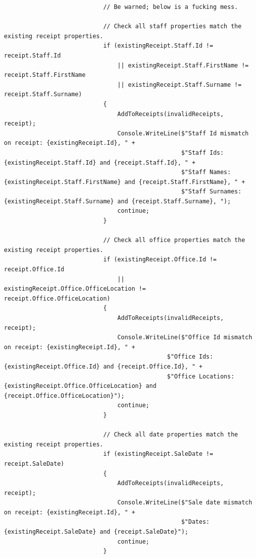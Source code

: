 \documentclass{article}
\begin{document}
\begin{lstlisting}
                            // Be warned; below is a fucking mess.

                            // Check all staff properties match the existing receipt properties.
                            if (existingReceipt.Staff.Id != receipt.Staff.Id
                                || existingReceipt.Staff.FirstName != receipt.Staff.FirstName
                                || existingReceipt.Staff.Surname != receipt.Staff.Surname)
                            {
                                AddToReceipts(invalidReceipts, receipt);
                                Console.WriteLine($"Staff Id mismatch on receipt: {existingReceipt.Id}, " +
                                                  $"Staff Ids: {existingReceipt.Staff.Id} and {receipt.Staff.Id}, " +
                                                  $"Staff Names: {existingReceipt.Staff.FirstName} and {receipt.Staff.FirstName}, " +
                                                  $"Staff Surnames: {existingReceipt.Staff.Surname} and {receipt.Staff.Surname}, ");
                                continue;
                            }

                            // Check all office properties match the existing receipt properties.
                            if (existingReceipt.Office.Id != receipt.Office.Id
                                || existingReceipt.Office.OfficeLocation != receipt.Office.OfficeLocation)
                            {
                                AddToReceipts(invalidReceipts, receipt);
                                Console.WriteLine($"Office Id mismatch on receipt: {existingReceipt.Id}, " +
                                              $"Office Ids: {existingReceipt.Office.Id} and {receipt.Office.Id}, " +
                                              $"Office Locations: {existingReceipt.Office.OfficeLocation} and {receipt.Office.OfficeLocation}");
                                continue;
                            }

                            // Check all date properties match the existing receipt properties.
                            if (existingReceipt.SaleDate != receipt.SaleDate)
                            {
                                AddToReceipts(invalidReceipts, receipt);
                                Console.WriteLine($"Sale date mismatch on receipt: {existingReceipt.Id}, " +
                                                  $"Dates: {existingReceipt.SaleDate} and {receipt.SaleDate}");
                                continue;
                            }











\end{lstlisting}
\end{document}
